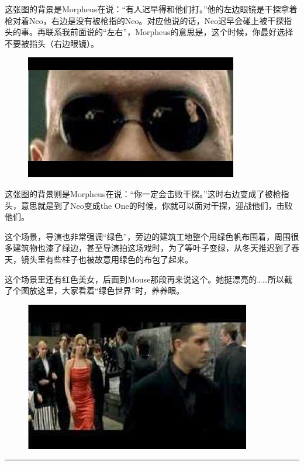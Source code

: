 \documentclass{ctexart}
\newcommand{\myparsep}{\noindent \rule[0.5ex]{\linewidth}{1pt}}
\begin{document}
这张图的背景是Morpheus在说：“有人迟早得和他们打。”他的左边眼镜是干探拿着枪对着Neo，右边是没有被枪指的Neo。对应他说的话，Neo迟早会碰上被干探指头的事。再联系我前面说的“左右”，Morpheus的意思是，这个时候，你最好选择不要被指头（右边眼镜）。

\begin{figure}[htb]
\centering
\includegraphics[width=0.5\linewidth]{fig/read_Matrix-35}
\end{figure}

这张图的背景则是Morpheus在说：“你一定会击败干探。”这时右边变成了被枪指头，意思就是到了Neo变成the One的时候，你就可以面对干探，迎战他们，击败他们。

这个场景，导演也非常强调“绿色”，旁边的建筑工地整个用绿色帆布围着，周围很多建筑物也漆了绿边，甚至导演拍这场戏时，为了等叶子变绿，从冬天推迟到了春天，镜头里有些柱子也被故意用绿色的布包了起来。

这个场景里还有红色美女，后面到Mouse那段再来说这个。她挺漂亮的……所以截了个图放这里，大家看着“绿色世界”时，养养眼。

\begin{figure}[htb]
\centering
\includegraphics[width=0.5\linewidth]{fig/read_Matrix-36}
\end{figure}

\myparsep
\end{document}
